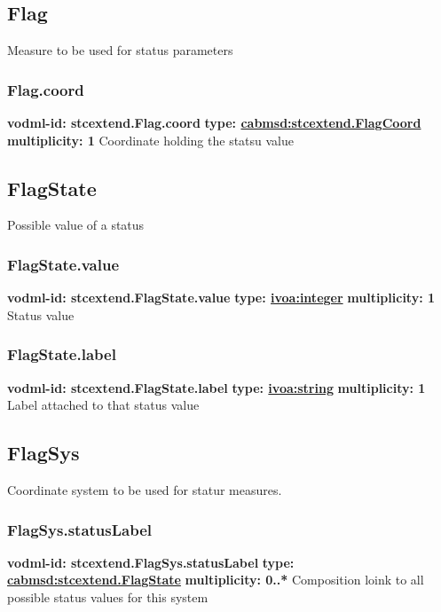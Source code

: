   \subsection{Flag}
  \label{sect:stcextend.Flag}
    Measure to be used for status parameters

    \subsubsection{Flag.coord}
      \textbf{vodml-id: stcextend.Flag.coord} \newline
      \textbf{type: \hyperref[sect:stcextend.FlagCoord]{cabmsd:stcextend.FlagCoord}} \newline
      \textbf{multiplicity: 1} \newline 
      Coordinate holding the statsu value

  \subsection{FlagState}
  \label{sect:stcextend.FlagState}
    Possible value of a status

    \subsubsection{FlagState.value}
      \textbf{vodml-id: stcextend.FlagState.value} \newline
      \textbf{type: \hyperref[sect:ivoa]{ivoa:integer}} \newline
      \textbf{multiplicity: 1} \newline 
      Status value

    \subsubsection{FlagState.label}
      \textbf{vodml-id: stcextend.FlagState.label} \newline
      \textbf{type: \hyperref[sect:ivoa]{ivoa:string}} \newline
      \textbf{multiplicity: 1} \newline 
      Label attached to that status value

  \subsection{FlagSys}
  \label{sect:stcextend.FlagSys}
    Coordinate system to be used for statur measures.

    \subsubsection{FlagSys.statusLabel}
      \textbf{vodml-id: stcextend.FlagSys.statusLabel} \newline
      \textbf{type: \hyperref[sect:stcextend.FlagState]{cabmsd:stcextend.FlagState}} \newline
      \textbf{multiplicity: 0..*} \newline 
      Composition loink to all possible status values for this system

